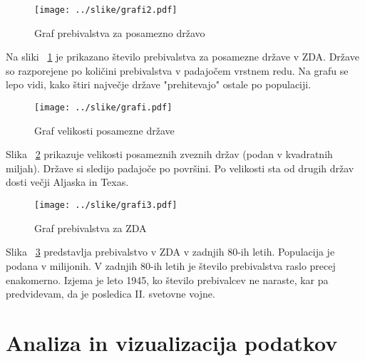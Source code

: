\documentclass[11pt,a4paper]{article}
\begin{document}
\pagebreak

\begin{figure}[H]
  \texttt{[image: ../slike/grafi2.pdf]}
  \caption{Graf prebivalstva za posamezno državo}
  \label{fig:Slika 1}
\end{figure}

Na sliki ~\ref{fig:Slika 1} je prikazano število prebivalstva za posamezne države v ZDA. Države so razporejene po količini prebivalstva v padajočem vrstnem redu. Na grafu se lepo vidi, kako štiri največje države "prehitevajo" ostale po populaciji.

\begin{figure}[H]
  \texttt{[image: ../slike/grafi.pdf]}
  \caption{Graf velikosti posamezne države}
  \label{fig:Slika 2}
\end{figure}

Slika ~\ref{fig:Slika 2} prikazuje velikosti posameznih zveznih držav (podan v kvadratnih miljah). Države si sledijo padajoče po površini. Po velikosti sta od drugih držav dosti večji Aljaska in Texas.\\

\begin{figure}[H]
  \texttt{[image: ../slike/grafi3.pdf]}
  \caption{Graf prebivalstva za ZDA}
  \label{fig:Slika 3}
\end{figure}

Slika ~\ref{fig:Slika 3} predstavlja prebivalstvo v ZDA v zadnjih 80-ih letih. Populacija je podana v milijonih.
V zadnjih 80-ih letih je število prebivalstva raslo precej enakomerno. Izjema je leto 1945, ko  število prebivalcev ne naraste, kar pa predvidevam, da je posledica II. svetovne vojne.

\pagebreak

\section{Analiza in vizualizacija podatkov}
\end{document}
